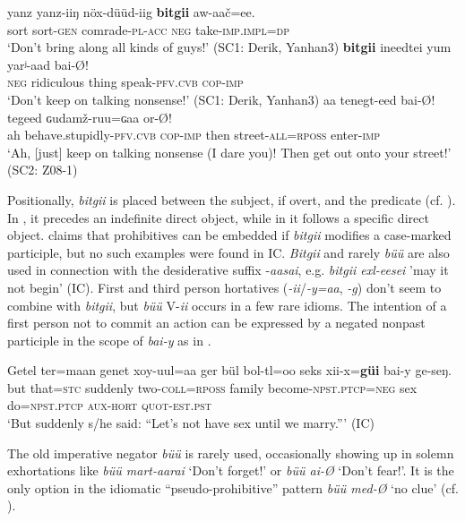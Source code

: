 \documentclass[output=paper,colorlinks,citecolor=brown,chinesefont]{langscibook}
\begin{document}
\ea\label{ex:kha:13}
    \gll yanz yanz-iiŋ nöx-düüd-iig \textbf{bitgii} aw-aač=ee. \\ 
         sort sort-\textsc{gen} comrade-\textsc{pl-acc} \textsc{neg} take-\textsc{imp.impl=dp} \\
    \glt ‘Don’t bring along all kinds of guys!’ (SC1: Derik, Yanhan3)
\z 
\ea\label{ex:kha:14}
    \gll \textbf{bitgii} ineedtei yum yarʲ-aad bai-Ø! \\ 
         \textsc{neg} ridiculous thing speak-\textsc{pfv.cvb} \textsc{cop-imp} \\
    \glt ‘Don’t keep on talking nonsense!’ (SC1: Derik, Yanhan3)
\z 
\ea\label{ex:kha:15}
    \gll aa tenegt-eed bai-Ø! tegeed ɢudamž-ruu=ɢaa or-Ø! \\ 
         ah behave.stupidly-\textsc{pfv.cvb} \textsc{cop-imp} then street-\textsc{all=rposs}  enter-\textsc{imp} \\
    \glt ‘Ah, [just] keep on talking nonsense (I dare you)! Then get out onto your street!’ (SC2: Z08-1)
\z 

Positionally, \textit{bitgii} is placed between the subject, if overt, and the predicate (cf. \citealt[82--84]{Yu1991}). In , it precedes an indefinite direct object, while in  it follows a specific direct object. \citet[87--88]{Yu1991} claims that prohibitives can be embedded if \textit{bitgii} modifies a case-marked participle, but no such examples were found in IC. \textit{Bitgii} and rarely \textit{büü} are also used in connection with the desiderative suffix -\textit{aasai}, e.g. \textit{bitgii exl-eesei} 'may it not begin' (IC). First and third person hortatives (\textit{-ii}/\textit{-y=aa}, \textit{-g}) don’t seem to combine with \textit{bitgii}, but \textit{büü} V-\textit{ii} occurs in a few rare idioms. The intention of a first person not to commit an action can be expressed by a negated nonpast participle in the scope of \textit{bai-y} as in . 

\ea\label{ex:kha:16}
    \gll Getel ter=maan genet xoy-uul=aa {ger bül} bol-tl=oo seks xii-x=\textbf{güi} bai-y ge-seŋ. \\ 
          but that=\textsc{stc} suddenly two-\textsc{coll=rposs} family become-\textsc{npst.ptcp=neg} sex do=\textsc{npst.ptcp} \textsc{aux-hort} \textsc{quot-est.pst} \\
    \glt ‘But suddenly s/he said: “Let’s not have sex until we marry.”’ (IC)
\z 

The old imperative negator \textit{büü} is rarely used, occasionally showing up in solemn exhortations like \textit{büü mart-aarai} ‘Don’t forget!’ or \textit{büü ai-Ø} ‘Don’t fear!’. It is the only option in the idiomatic “pseudo-prohibitive” pattern \textit{büü med-Ø} ‘no clue’ (cf. \citealt[73--74]{Yu1991}).
\end{document}
